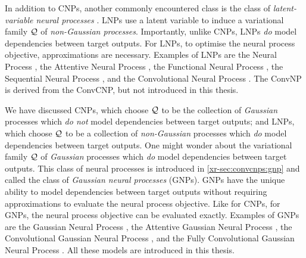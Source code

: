 \documentclass[12pt, twoside]{report}
\newcommand{\xrprefix}[1]{xr-#1}
\begin{document}
In addition to CNPs, another commonly encountered class is the class of \emph{latent-variable neural processes} \parencite[LNPs;][]{Garnelo:2018:Neural_Processes}.
LNPs use a latent variable to induce a variational family $\mathcal{Q}$ of \emph{non-Gaussian processes}.
Importantly, unlike CNPs, LNPs \emph{do} model dependencies between target outputs.
For LNPs, to optimise the neural process objective, approximations are necessary.
Examples of LNPs are the Neural Process \parencite[NP;][]{Garnelo:2018:Neural_Processes}, the Attentive Neural Process \parencite[ANP;][]{Kim:2019:Attentive_Neural_Processes}, the Functional Neural Process \parencite[FNP;][]{Louizos:2019:The_Functional_Neural_Process}, the Sequential Neural Process \parencite[SNP;][]{Singh:2019:Sequential_Neural_Processes}, and the Convolutional Neural Process \parencite[CovnNP;][]{Foong:2020:Meta-Learning_Stationary_Stochastic_Process_Prediction}.
The ConvNP is derived from the ConvCNP, but not introduced in this thesis.

We have discussed CNPs, which choose $\mathcal{Q}$ to be the collection of \emph{Gaussian} processes which \emph{do not} model dependencies between target outputs;
and LNPs, which choose $\mathcal{Q}$ to be a collection of \emph{non-Gaussian} processes which \emph{do} model dependencies between target outputs.
One might wonder about the variational family $\mathcal{Q}$ of \emph{Gaussian} processes which \emph{do} model dependencies between target outputs.
This class of neural processes is introduced in \cref{\xrprefix{sec:convcnps:gnp}} and called the class of \emph{Gaussian neural processes} (GNPs).
GNPs have the unique ability to model dependencies between target outputs without requiring approximations to evaluate the neural process objective.
Like for CNPs, for GNPs, the neural process objective can be evaluated exactly.
Examples of GNPs are the Gaussian Neural Process \parencite[GNP; \cref{\xrprefix{chap:experiments}};][]{Markou:2022:Practical_Conditional_Neural_Processes_for_Tractable}, the Attentive Gaussian Neural Process \parencite[AGNP; \cref{\xrprefix{chap:experiments}};][]{Markou:2022:Practical_Conditional_Neural_Processes_for_Tractable}, the Convolutional Gaussian Neural Process \parencite[ConvGNP; \cref{\xrprefix{sec:convcnps:gnp}};][]{Markou:2022:Practical_Conditional_Neural_Processes_for_Tractable}, and the Fully Convolutional Gaussian Neural Process \parencite[FullConvGNP; \cref{\xrprefix{sec:convcnps:gnp}};][]{Bruinsma:2021:The_Gaussian_Neural_Process}.
All these models are introduced in this thesis.
\end{document}
